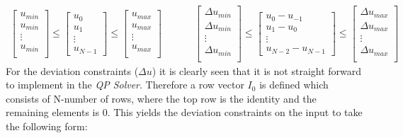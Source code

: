 \begin{equation}
    \begin{matrix}
        \begin{bmatrix}
            u_{min}\\
            u_{min}\\
            \vdots\\
            u_{min}\\
        \end{bmatrix} \leq
        \begin{bmatrix}
            u_0\\
            u_1\\
            \vdots\\
            u_{N-1}
        \end{bmatrix} \leq
        \begin{bmatrix}
            u_{max}\\
            u_{max}\\
            \vdots\\
            u_{max}\\
        \end{bmatrix}
        & & & &
        \begin{bmatrix}
            \Delta u_{min}\\
            \Delta u_{min}\\
            \vdots\\
            \Delta u_{min}\\
        \end{bmatrix} \leq
        \begin{bmatrix}
            u_0-u_{-1}\\
            u_1-u_0\\
            \vdots\\
            u_{N-2}-u_{N-1}
        \end{bmatrix} \leq
        \begin{bmatrix}
            \Delta u_{max}\\
            \Delta u_{max}\\
            \vdots\\
            \Delta u_{max}\\
        \end{bmatrix}
    \end{matrix}
\end{equation}
For the deviation constraints ($\Delta u$) it is clearly seen that it is not straight forward to implement in the \textit{QP Solver}. Therefore a row vector $I_0$ is defined which consists of N-number of rows, where the top row is the identity and the remaining elements is 0. This yields the deviation constraints on the input to take the following form:
